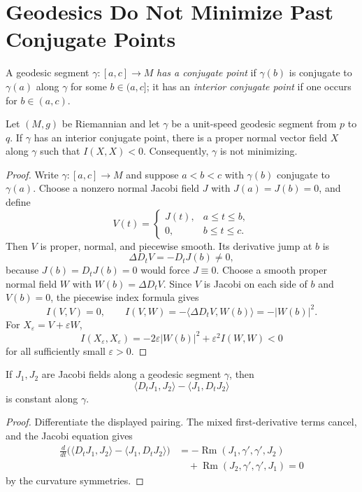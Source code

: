 \section{Geodesics Do Not Minimize Past Conjugate Points}

A geodesic segment $\gamma\colon[a,c]\to M$ \emph{has a conjugate point} if
$\gamma(b)$ is conjugate to $\gamma(a)$ along $\gamma$ for some
$b\in(a,c]$; it has an \emph{interior conjugate point} if one occurs for
$b\in(a,c)$.

\begin{theorem}
\label{thm:no-minimize-past-conjugate}

Let $(M,g)$ be Riemannian and let $\gamma$ be a unit-speed geodesic segment
from $p$ to $q$. If $\gamma$ has an interior conjugate point, there is a proper
normal vector field $X$ along $\gamma$ such that $I(X,X)<0$. Consequently,
$\gamma$ is not minimizing.
\end{theorem}

\begin{proof}
\sketch Write $\gamma\colon[a,c]\to M$ and suppose
$a<b<c$ with $\gamma(b)$ conjugate to $\gamma(a)$. Choose a nonzero normal
Jacobi field $J$ with $J(a)=J(b)=0$, and define
\[
V(t)=
\begin{cases}
J(t),&a\leq t\leq b,\\
0,&b\leq t\leq c.
\end{cases}
\]
Then $V$ is proper, normal, and piecewise smooth. Its derivative jump at $b$ is
\[
\Delta D_tV=-D_tJ(b)\ne0,
\]
because $J(b)=D_tJ(b)=0$ would force $J\equiv0$. Choose a smooth proper
normal field $W$ with $W(b)=\Delta D_tV$. Since $V$ is Jacobi on each side of
$b$ and $V(b)=0$, the piecewise index formula gives
\[
I(V,V)=0,
\qquad
I(V,W)=-\langle\Delta D_tV,W(b)\rangle=-|W(b)|^2.
\]
For $X_\varepsilon=V+\varepsilon W$,
\[
I(X_\varepsilon,X_\varepsilon)
=-2\varepsilon|W(b)|^2+\varepsilon^2I(W,W)<0
\]
for all sufficiently small $\varepsilon>0$.
\end{proof}

\begin{lemma}
\label{lem:jacobi-field-constant-pairing}
If $J_1,J_2$ are Jacobi fields along a geodesic segment $\gamma$, then
\[
\langle D_tJ_1,J_2\rangle-\langle J_1,D_tJ_2\rangle
\]
is constant along $\gamma$.
\end{lemma}

\begin{proof}
\sketch Differentiate the displayed pairing. The mixed first-derivative terms
cancel, and the Jacobi equation gives
\begin{align*}
\frac d{dt}\bigl(
\langle D_tJ_1,J_2\rangle-\langle J_1,D_tJ_2\rangle
\bigr)
&=-\operatorname{Rm}(J_1,\gamma',\gamma',J_2)\\
&\quad+\operatorname{Rm}(J_2,\gamma',\gamma',J_1)=0
\end{align*}
by the curvature symmetries.
\end{proof}

